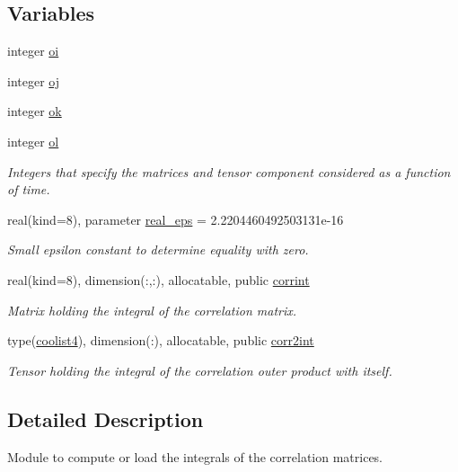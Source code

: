 \subsection*{Variables}
\begin{DoxyCompactItemize}
\item 
integer \hyperlink{namespaceint__corr_abddd3a2d3e1bfa4f09d96eaf090e9a95}{oi}
\item 
integer \hyperlink{namespaceint__corr_a114182df2066db340a9c42d9edd1583e}{oj}
\item 
integer \hyperlink{namespaceint__corr_a4af4666df7c0f30de448d09ae160caf4}{ok}
\item 
integer \hyperlink{namespaceint__corr_a3fe0c6bccf317d65552767f983f1cb62}{ol}
\begin{DoxyCompactList}\small\item\em Integers that specify the matrices and tensor component considered as a function of time. \end{DoxyCompactList}\item 
real(kind=8), parameter \hyperlink{namespaceint__corr_ab379731156e2a2dd2d0b11766d766a85}{real\+\_\+eps} = 2.\+2204460492503131e-\/16
\begin{DoxyCompactList}\small\item\em Small epsilon constant to determine equality with zero. \end{DoxyCompactList}\item 
real(kind=8), dimension(\+:,\+:), allocatable, public \hyperlink{namespaceint__corr_ab3c1d22e8c15412a3b535c8301b0c42d}{corrint}
\begin{DoxyCompactList}\small\item\em Matrix holding the integral of the correlation matrix. \end{DoxyCompactList}\item 
type(\hyperlink{structtensor_1_1coolist4}{coolist4}), dimension(\+:), allocatable, public \hyperlink{namespaceint__corr_a1422cac2c54e6d7837159fe9fb3a6d6b}{corr2int}
\begin{DoxyCompactList}\small\item\em Tensor holding the integral of the correlation outer product with itself. \end{DoxyCompactList}\end{DoxyCompactItemize}


\subsection{Detailed Description}
Module to compute or load the integrals of the correlation matrices. 

